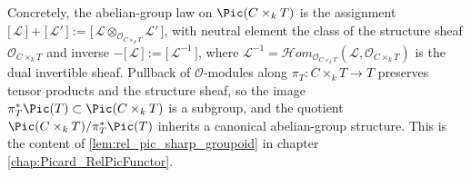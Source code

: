 Concretely, the abelian-group law on \(\Pic(C \times_k T)\) is the assignment
\(\bigl[\,\mathcal{L}\,\bigr] + \bigl[\,\mathcal{L}'\,\bigr] :=
\bigl[\,\mathcal{L} \otimes_{\mathcal{O}_{C \times_k T}} \mathcal{L}'\,\bigr]\),
with neutral element the class of the structure sheaf
\(\mathcal{O}_{C \times_k T}\) and inverse
\(- \bigl[\,\mathcal{L}\,\bigr] := \bigl[\,\mathcal{L}^{-1}\,\bigr]\), where
\(\mathcal{L}^{-1} = \mathcal{H}om_{\mathcal{O}_{C \times_k T}}(\mathcal{L},
\mathcal{O}_{C \times_k T})\) is the dual invertible sheaf. Pullback of
\(\mathcal{O}\)-modules along \(\pi_T : C \times_k T \to T\) preserves tensor
products and the structure sheaf, so the image
\(\pi_T^* \Pic(T) \subset \Pic(C \times_k T)\) is a subgroup, and the quotient
\(\Pic(C \times_k T) / \pi_T^* \Pic(T)\) inherits a canonical abelian-group
structure. This is the content of
\cref{lem:rel_pic_sharp_groupoid} in chapter \cref{chap:Picard_RelPicFunctor}.

